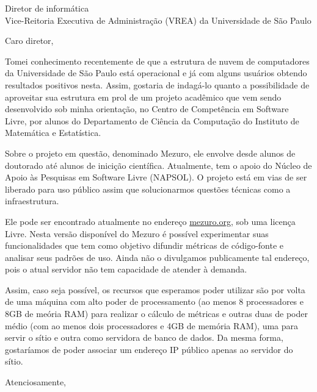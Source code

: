 \documentclass[a4paper,10pt]{letter}
\begin{document}
\begin{letter}{ Diretor de informática \\ Vice-Reitoria Executiva de Administração (VREA) da Universidade de São Paulo}

\opening{ Caro diretor, }

Tomei conhecimento recentemente de que a estrutura de nuvem de computadores da Universidade de São Paulo está operacional e já com alguns usuários obtendo resultados positivos nesta. Assim, gostaria de indagá-lo quanto a possibilidade de aproveitar sua estrutura em prol de um projeto acadêmico que vem sendo desenvolvido sob minha orientação, no Centro de Competência em Software Livre, por alunos do Departamento de Ciência da Computação do Instituto de Matemática e Estatística.

Sobre o projeto em questão, denominado Mezuro, ele envolve desde alunos de doutorado até alunos de inicição científica. Atualmente, tem o apoio do Núcleo de Apoio às Pesquisas em Software Livre (NAPSOL). O projeto está em vias de ser liberado para uso público assim que solucionarmos questões técnicas como a infraestrutura.

Ele pode ser encontrado atualmente no endereço \url{mezuro.org}, sob uma licença Livre. Nesta versão disponível do Mezuro é possível experimentar suas funcionalidades que tem como objetivo difundir métricas de código-fonte e analisar seus padrões de uso. Ainda não o divulgamos publicamente tal endereço, pois o atual servidor não tem capacidade de atender à demanda.

Assim, caso seja possível, os recursos que esperamos poder utilizar são por volta de uma máquina com alto poder de processamento (ao menos 8 processadores e 8GB de meória RAM) para realizar o cálculo de métricas e outras duas de poder médio (com ao menos dois processadores e 4GB de memória RAM), uma para servir o sítio e outra como servidora de banco de dados. Da mesma forma, gostaríamos de poder associar um endereço IP público apenas ao servidor do sítio.

\closing{Atenciosamente,}

\end{letter}
\end{document}
